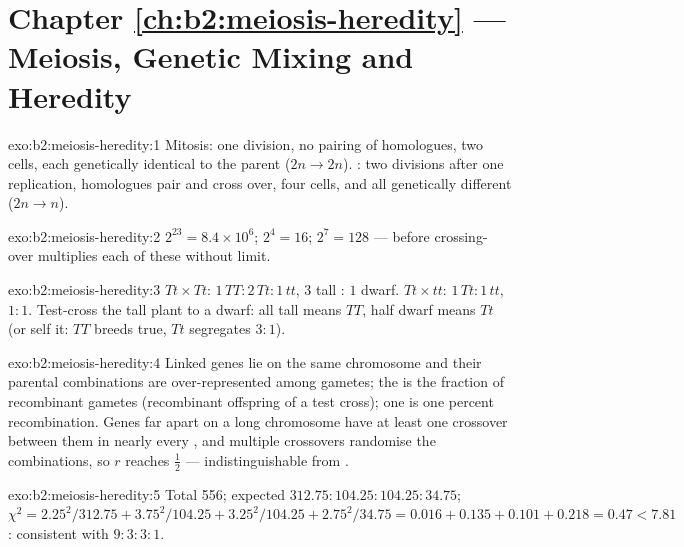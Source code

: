 \section*{Chapter \ref{ch:b2:meiosis-heredity} --- Meiosis, Genetic Mixing and Heredity}

\begin{solution}{exo:b2:meiosis-heredity:1}
Mitosis: one division, no pairing of homologues, two cells, each
genetically identical to the parent ($2n \to 2n$). : two
divisions after one replication, homologues pair and cross over,
four cells,  and all genetically different ($2n \to n$).
\end{solution}

\begin{solution}{exo:b2:meiosis-heredity:2}
$2^{23} = 8.4\times 10^{6}$; $2^{4} = 16$; $2^{7} = 128$ --- before
crossing-over multiplies each of these without limit.
\end{solution}

\begin{solution}{exo:b2:meiosis-heredity:3}
$Tt\times Tt$:  $1\,TT : 2\,Tt : 1\,tt$,  $3$ tall
: $1$ dwarf. $Tt\times tt$: $1\,Tt : 1\,tt$, $1 : 1$. Test-cross the
tall plant to a dwarf: all tall means $TT$, half dwarf means $Tt$
(or self it: $TT$ breeds true, $Tt$ segregates $3 : 1$).
\end{solution}

\begin{solution}{exo:b2:meiosis-heredity:4}
Linked genes lie on the same chromosome and their parental 
combinations are over-represented among gametes; the  is the fraction of recombinant gametes (recombinant
offspring of a test cross); one  is one percent
recombination. Genes far apart on a long chromosome have at least
one crossover between them in nearly every , and multiple
crossovers randomise the combinations, so $r$ reaches $\tfrac12$ ---
indistinguishable from .
\end{solution}

\begin{solution}{exo:b2:meiosis-heredity:5}
Total 556; expected $312.75 : 104.25 : 104.25 : 34.75$; $\chi^2 =
2.25^2/312.75 + 3.75^2/104.25 + 3.25^2/104.25 + 2.75^2/34.75 = 0.016
+ 0.135 + 0.101 + 0.218 = 0.47 < 7.81$: consistent with $9 : 3 : 3 :
1$.
\end{solution}

